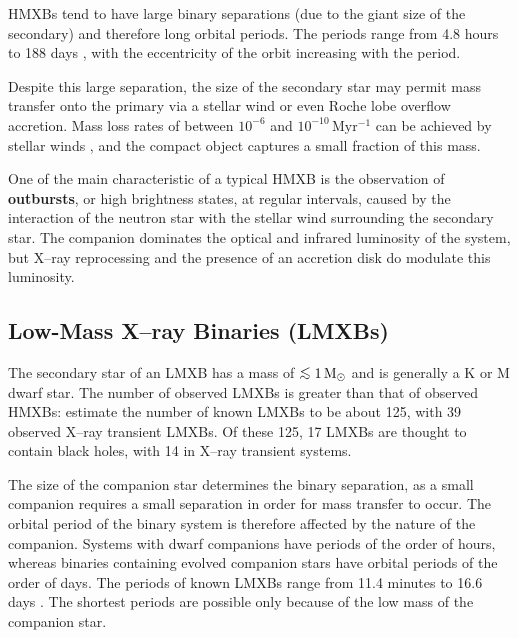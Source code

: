 \vspace{\myparskip}

HMXBs tend to have large binary separations (due to the giant size of
the secondary) and therefore long orbital periods. The periods range from 4.8 hours to 188 days
\cite{VanParadijs:1995}, with the eccentricity of the orbit increasing with the period. %

\vspace{\myparskip}

Despite this large separation, the size of the secondary star may
permit mass transfer onto the primary via a stellar wind or even Roche lobe
overflow accretion. %
Mass loss rates of between $10^{-6}$ and $10^{-10}$\,M\sun $\mathrm{yr}^{-1}$ can be
achieved by stellar winds %
\cite{WhiteNagaseParmar:1995}, %
and the compact object captures a small fraction of this mass. %

\vspace{\myparskip}

One of the main characteristic of a typical HMXB is the observation of
\textbf{outbursts}, or high brightness states, at regular intervals,
caused by the interaction of the neutron star with the stellar wind
surrounding the 
secondary star. The companion dominates the optical and infrared
luminosity of the system, but X--ray reprocessing and the presence of an accretion disk do modulate
this luminosity. %


\subsection{Low-Mass X--ray Binaries (LMXBs)}
\label{cha:Introduction:sec:X--rayBinaries:subsec:LMXBs}

The secondary star of an LMXB has a mass of $\lsim 1\,\mathrm{M}\sun$
and is generally a K or M dwarf star. The number of observed LMXBs is greater than that of observed HMXBs: %
estimate the number of known LMXBs to be about 125, with 39 observed
X--ray transient LMXBs. Of these 125, 17 LMXBs are thought to contain black holes, with 14 in X--ray transient systems. %

\vspace{\myparskip}

The size of the companion star determines the binary separation, as a
small companion requires a small separation in order for mass transfer to
occur. The orbital period of the binary system is therefore affected by the
nature of the companion. Systems with dwarf companions have
periods of the order of hours, whereas binaries containing evolved
companion stars have orbital periods of the order of days. The periods of known LMXBs range from 11.4 minutes to 16.6 days %
\cite{VanParadijs:1995}. %
The shortest periods are possible only because of the low mass of the
companion star. %

